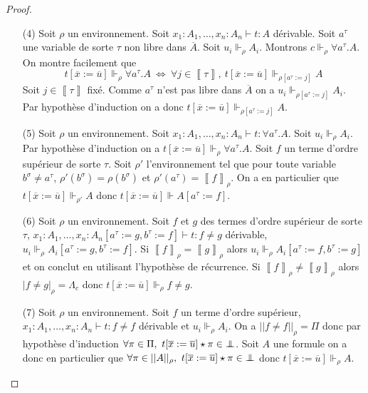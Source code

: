 \documentclass[a4paper,12pt]{article}
\theoremstyle{rmqstyle}
\newcommand{\abs}[1]{\lvert#1\rvert}
\newcommand{\abss}[1]{\lvert \lvert#1\rvert \rvert}
\newcommand{\itp}[1]{\left\llbracket#1\right\rrbracket}
\renewcommand{\iff}{\Leftrightarrow}
\newcommand{\pole}{{\protect\mathpalette{\protect\polehelper}{\bot}}} \def\polehelper#1#2{\mathrel{\rlap{$#1#2$}\mkern3mu{#1#2}}}
\renewcommand{\bar}{\overline}
\begin{document}
\begin{proof}
\begin{itemize}
\item[(4)] Soit $\rho$ un environnement. Soit $x_1 : A_1, \dots, x_n : A_n \vdash t : A$ dérivable. Soit $a^\tau$ une variable de sorte $\tau$ non libre dans $\bar{A}$. Soit $u_i \Vdash_\rho A_i$. Montrons $c \Vdash_\rho \forall a^\tau. A$.\\
On montre facilement que 
$$t[\bar{x} := \bar{u}] \Vdash_\rho \forall a^\tau. A \ \iff \ \forall j \in \itp{\tau}, \ t[\bar{x} := \bar{u}] \Vdash_{\rho[a^\tau := j]} A$$
Soit $j \in \itp{\tau}$ fixé. Comme $a^\tau$ n'est pas libre dans $\bar{A}$ on a $u_i \Vdash_{\rho[a^\tau := j]} A_i$. Par hypothèse d'induction on a donc $t[\bar{x} := \bar{u}] \Vdash_{\rho[a^\tau := j]} A$.\\

\item[(5)] Soit $\rho$ un environnement. Soit $x_1 : A_1, \dots, x_n : A_n \vdash t : \forall a^\tau.A$. Soit $u_i \Vdash_\rho A_i$. Par hypothèse d'induction on a $t[\bar{x} := \bar{u}] \Vdash_\rho \forall a^\tau.A$. Soit $f$ un terme d'ordre supérieur de sorte $\tau$. Soit $\rho'$ l'environnement tel que pour toute variable $b^\sigma \neq a^\tau$, $\rho'(b^\sigma) = \rho(b^\sigma)$ et $\rho'(a^\tau) = \itp{f}_\rho$. On a en particulier que $t[\bar{x} := \bar{u}] \Vdash_{\rho'} A$ donc $t[\bar{x} := \bar{u}] \Vdash A[a^\tau := f]$.\\

\item[(6)] Soit $\rho$ un environnement. Soit $f$ et $g$ des termes d'ordre supérieur de sorte $\tau$, $x_1 : A_1, \dots, x_n : A_n[a^\tau := g, b^\tau := f] \vdash t : f \neq g$ dérivable, $u_i \Vdash_\rho A_i[a^\tau := g, b^\tau := f]$. Si $\itp{f}_\rho = \itp{g}_\rho$ alors $u_i \Vdash_\rho A_i[a^\tau := f, b^\tau := g]$ et on conclut en utilisant l'hypothèse de récurrence. Si $\itp{f}_\rho \neq \itp{g}_\rho$ alors $\abs{f \neq g}_\rho = \Lambda_c$ donc $t[\bar{x} := \bar{u}] \Vdash_\rho f \neq g$.\\

\item[(7)] Soit $\rho$ un environnement. Soit $f$ un terme d'ordre supérieur, $x_1 : A_1, \dots, x_n : A_n \vdash t : f \neq f$ dérivable et $u_i \Vdash_\rho A_i$. On a $\abss{f \neq f}_\rho = \Pi$ donc par hypothèse d'induction $\forall \pi \in \Pi, \ t[\bar{x} := \bar{u}] \star \pi \in \pole$. Soit $A$ une formule on a donc en particulier que $\forall \pi \in \abss{A}_\rho, \ t[\bar{x} := \bar{u}] \star \pi \in \pole$ donc $t[\bar{x} := \bar{u}] \Vdash_\rho A$.\\


\end{itemize}
\end{proof}
\end{document}
